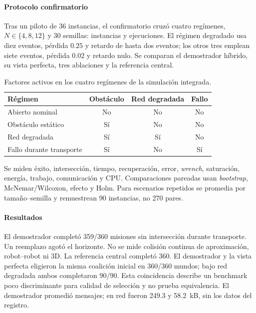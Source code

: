 \paragraph{Protocolo confirmatorio}

Tras un piloto de 36 instancias, el confirmatorio cruzó cuatro regímenes, $N\in\{4,8,12\}$ y 30 semillas: \CargoEtwoEWorlds{} instancias y \CargoEtwoERuns{} ejecuciones. El régimen degradado usa diez eventos, pérdida $0.25$ y retardo de hasta dos eventos; los otros tres emplean siete eventos, pérdida $0.02$ y retardo nulo. Se comparan el demostrador híbrido, su vista perfecta, tres ablaciones y la referencia central.

\begin{table}[!htbp]
  \centering
  \caption{Factores activos en los cuatro regímenes de la simulación integrada.}
  \label{tab:cargo-e2e-regimes}
  \small
  \begin{tabular}{lccc}
    \toprule
    Régimen & Obstáculo & Red degradada & Fallo \\
    \midrule
    Abierto nominal & No & No & No \\
    Obstáculo estático & Sí & No & No \\
    Red degradada & Sí & Sí & No \\
    Fallo durante transporte & Sí & No & Sí \\
    \bottomrule
  \end{tabular}
  \viuownsource
\end{table}

Se miden éxito, intersección, tiempo, recuperación, error, \emph{wrench}, saturación, energía, trabajo, comunicación y CPU. Comparaciones pareadas usan \emph{bootstrap}, McNemar/Wilcoxon, efecto y Holm. Para escenarios repetidos se promedia por tamaño--semilla y remuestrean 90 instancias, no 270 pares.

\paragraph{Resultados}

El demostrador completó 359/360 misiones sin intersección durante transporte. Un reemplazo agotó el horizonte. No se mide colisión continua de aproximación, robot--robot ni 3D. La referencia central completó 360. El demostrador y la vista perfecta eligieron la misma coalición inicial en 360/360 mundos; bajo red degradada ambos completaron 90/90. Esta coincidencia describe un benchmark poco discriminante para calidad de selección y no prueba equivalencia. El demostrador promedió \CargoEtwoEMessages{} mensajes; en red fueron 249.3 y 58.2~kB, sin los datos del registro.

